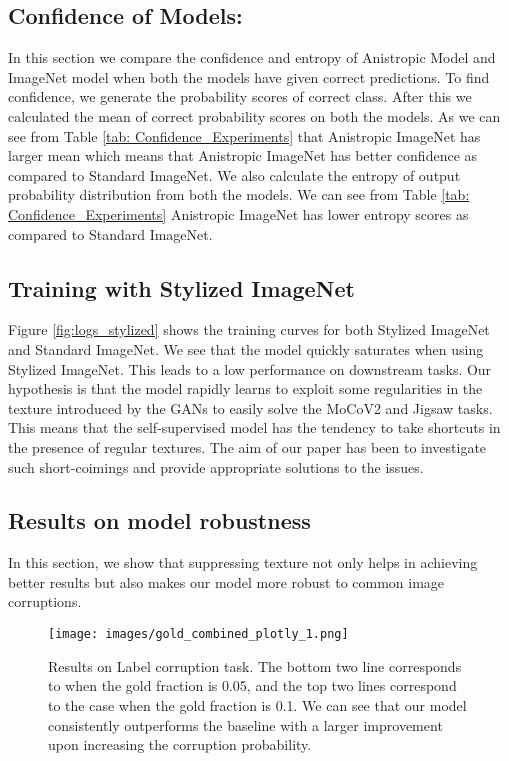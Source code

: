 \documentclass{bmvc2k}
\begin{document}
\subsection{Confidence of Models:}
In this section we compare the confidence and entropy of Anistropic Model and ImageNet model when both the models have given correct predictions. To find confidence, we generate the probability scores of correct class. After this we calculated the mean of correct probability scores on both the models.  As we can see from Table \ref{tab: Confidence_Experiments} that Anistropic ImageNet has larger mean which means that Anistropic ImageNet has better confidence as compared to Standard ImageNet.
We also calculate the entropy of output probability distribution from both the models. We can see from Table \ref{tab: Confidence_Experiments} Anistropic ImageNet has lower entropy scores as compared to Standard ImageNet.

\subsection{Training with Stylized ImageNet}
Figure \ref{fig:logs_stylized} shows the training curves for both Stylized ImageNet and Standard ImageNet. We see that the model quickly saturates when using Stylized ImageNet. This leads to a low performance on downstream tasks. Our hypothesis is that the model rapidly learns to exploit some regularities in the texture introduced by the GANs to easily solve the MoCoV2 and Jigsaw tasks. This means that the self-supervised model has the tendency to take shortcuts in the presence of regular textures. The aim of our paper has been to investigate such short-coimings and provide appropriate solutions to the issues.



\subsection{Results on model robustness}
In this section, we show that suppressing texture not only helps in achieving better results but also makes our model more robust to common image corruptions.
 
 
\begin{figure}
\centering
\texttt{[image: images/gold\_combined\_plotly\_1.png]}
\caption{Results on Label corruption task. The bottom two line corresponds to when the gold fraction is 0.05, and the top two lines correspond to the case when the gold fraction is 0.1.   We can see that our model consistently outperforms the baseline with a larger improvement upon increasing the corruption probability.
}
\label{fig:label_corruption}
\end{figure}
\end{document}
